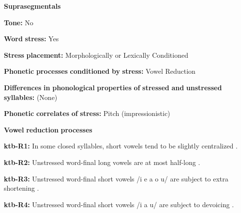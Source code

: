\documentclass[output=paper]{langsci/langscibook}
\begin{document}
\begin{styleBody}
\textbf{Suprasegmentals}
\end{styleBody}

\begin{styleBody}
\textbf{Tone:} No
\end{styleBody}

\begin{styleBody}
\textbf{Word} \textbf{stress:} Yes
\end{styleBody}

\begin{styleBody}
\textbf{Stress} \textbf{placement:} Morphologically or Lexically Conditioned
\end{styleBody}

\begin{styleBody}
\textbf{Phonetic} \textbf{processes} \textbf{conditioned} \textbf{by} \textbf{stress:} Vowel Reduction
\end{styleBody}

\begin{styleBody}
\textbf{Differences} \textbf{in} \textbf{phonological} \textbf{properties} \textbf{of} \textbf{stressed} \textbf{and} \textbf{unstressed} \textbf{syllables:} (None)
\end{styleBody}

\begin{styleBody}
\textbf{Phonetic} \textbf{correlates} \textbf{of} \textbf{stress:} Pitch (impressionistic)
\end{styleBody}

\begin{styleBody}
\textbf{Vowel} \textbf{reduction} \textbf{processes}
\end{styleBody}

\begin{styleBody}
\textbf{ktb-R1:} In some closed syllables, short vowels tend to be slightly centralized \citep[18]{Treis2008}.
\end{styleBody}

\begin{styleBody}
\textbf{ktb-R2:} Unstressed word-final long vowels are at most half-long \citep[19]{Treis2008}.
\end{styleBody}

\begin{styleBody}
\textbf{ktb-R3:} Unstressed word-final short vowels /i e a o u/ are subject to extra shortening \citep[20]{Treis2008}.
\end{styleBody}

\begin{styleBody}
\textbf{ktb-R4:} Unstressed word-final short vowels /i a u/ are subject to devoicing \citep[20]{Treis2008}.
\end{styleBody}
\end{document}
